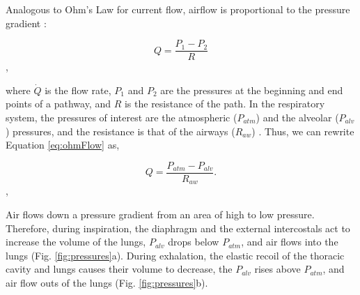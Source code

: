 \documentclass[12pt]{article}
\begin{document}
Analogous to Ohm's Law for current flow, airflow is proportional to the pressure gradient \cite{sanchez2010respiratory}:

\begin{equation}
Q= \frac{P_1 - P_2}{R}
\label{eq:ohmFlow}
\end{equation},

where $\dot{Q}$ is the flow rate, $P_1$ and $P_2$ are the pressures at the beginning and end points of a pathway, and $R$ is the resistance of the path. In the respiratory system, the pressures of interest are the atmospheric ($P_{atm}$) and the alveolar ($P_{alv}$) pressures, and the resistance is that of the airways ($R_{aw}$) \cite{sanchez2010respiratory}. Thus, we can rewrite Equation \ref{eq:ohmFlow} as,

\begin{equation}
Q= \frac{P_{atm} - P_{alv}}{R_{aw}}.
\label{eq:ohmFlowResp}
\end{equation},

Air flows down a pressure gradient from an area of high to low pressure. Therefore, during inspiration, the diaphragm and the external intercostals act to increase the volume of the lungs, $P_{alv}$ drops below $P_{atm}$, and air flows into the lungs (Fig. \ref{fig:pressures}a). During exhalation, the elastic recoil of the thoracic cavity and lungs causes their volume to decrease, the $P_{alv}$ rises above $P_{atm}$, and air flow outs of the lungs (Fig. \ref{fig:pressures}b).  
\end{document}

